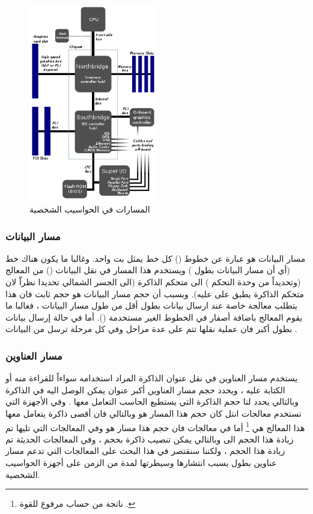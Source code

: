 \documentclass[document.tex]{subfiles}
\begin{document}
\begin{figure}[h!]
  \label{fig:fsb} 
  \caption{المسارات في الحواسيب الشخصية }
  \centering
   \includegraphics[width=0.5\textwidth]{../img/fsb}
\end{figure}

\subsubsection{مسار البيانات }
مسار البيانات هو عبارة عن خطوط () كل خط يمثل بت واحد. وغالبا ما يكون هناك  خط (أي أن مسار البيانات بطول ) ويستخدم هذا المسار في نقل البيانات () من المعالج (وتحديداً من وحدة التحكم ) الى متحكم الذاكرة (الى الجسر الشمالي  تحديدا نظراّ لان متحكم الذاكرة يطبق على عليه). وبسبب أن حجم مسار البيانات هو حجم ثابت فان هذا يتطلب معالجة خاصة عند ارسال بيانات بطول أقل من طول مسار البيانات ، فغالبا ما يقوم المعالج باضافة أصفار في الخطوط الغير مستخدمة (). أما في حالة إرسال بيانات بطول أكبر فان عملية نقلها تتم على عدة مراحل وفي كل مرحلة ترسل  من البيانات .

\subsubsection{مسار العناوين }
يستخدم مسار العناوين في نقل عنوان الذاكرة المراد استخدامه سواءاً للقراءة منه أو الكتابة عليه ، ويحدد حجم مسار العناوين أكبر عنوان يمكن الوصل اليه في الذاكرة وبالتالي يحدد لنا حجم الذاكرة التي يستطيع الحاسب التعامل معها . وفي الأجهزة التي تستخدم معالجات انتل  كان حجم هذا المسار هو  وبالتالي فان أقصى ذاكرة يتعامل معها هذا المعالج هي \footnote{ناتجة من حساب  مرفوع للقوة .} أما في معالجات  فان حجم هذا مسار هو  وفي المعالجات التي تليها تم زيادة هذا الحجم الى  وبالتالي يمكن تنصيب ذاكرة بحجم  ، وفي المعالجات الحديثة تم زيادة هذا الحجم ، ولكننا سنقتصر في هذا البحث على المعالجات التي تدعم مسار عناوين بطول  بسبب انتشارها وسيطرتها لمدة من الزمن على أجهزة الحواسيب الشخصية.
\end{document}
